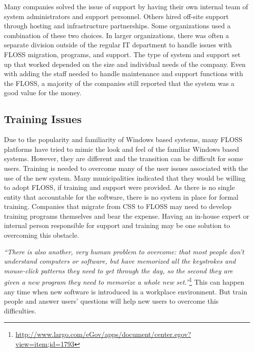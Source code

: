  Many companies solved the issue of support by having their own internal team of system administrators and support personnel. Others hired off-site support through hosting and infrastructure partnerships. Some organizations used a combination of these two choices. In larger organizations, there was often a separate division outside of the regular IT department to handle issues with FLOSS migration, programs, and support. The type of system and support set up that worked depended on the size and individual needs of the company.  Even with adding the staff needed to handle maintenance and support functions with the FLOSS, a majority of the companies still reported that the system was a good value for the money.

 \subsection{Training Issues}

 Due to the popularity and familiarity of Windows based systems, many FLOSS platforms have tried to mimic the look and feel of the familiar Windows based systems. However, they are different and the transition can be difficult for some users. Training is needed to overcome many of the user issues associated with the use of the new system. Many municipalities indicated that they would be willing to adopt FLOSS, if training and support were provided. As there is no single entity that accountable for the software, there is no system in place for formal training. Companies that migrate from CSS to FLOSS may need to develop training programs themselves and bear the expense. Having an in-house expert or internal person responsible for support and training may be one solution to overcoming this obstacle.
 
\textit{``There is also another, very human problem to overcome: that most people don't understand computers or software, but have memorized all the keystrokes and mouse-click patterns they need to get through the day, so the second they are given a new program they need to memorize a whole new set.''}\footnote{\url{http://www.largo.com/eGov/apps/document/center.egov?view=item;id=1793}} This can happen any time when new software is introduced in a workplace environment. But train people and answer users' questions will help new users to overcome this difficulties.

